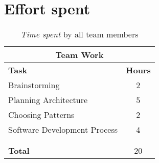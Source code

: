 \documentclass[../RASD.tex]{subfiles}
\begin{document}
    \chapter{Effort spent}\label{ch:effort-spent}
    \begin{table}[h]
        \centering
        \begin{tabular}{l c}
            \hline\hline
            \multicolumn{2}{c}{\textbf{Team Work}} \\
            \hline
            \textbf{Task} & \textbf{Hours} \\ [0.5ex]
            \hline
            Brainstorming & 2 \\
            Planning Architecture & 5 \\
            Choosing Patterns & 2 \\
            Software Development Process & 4  \\
             &  \\
             &   \\
            \hline
            \textbf{Total} & 20  \\
            \hline
        \end{tabular}
        \caption{\textit{Time spent} by all team members}
        \label{fig:Time spent by all team members}
    \end{table}
\end{document}
